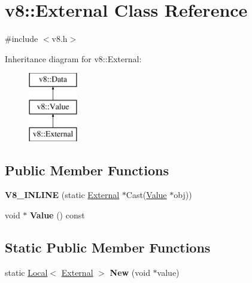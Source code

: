 \hypertarget{classv8_1_1_external}{}\section{v8\+:\+:External Class Reference}
\label{classv8_1_1_external}


{\ttfamily \#include $<$v8.\+h$>$}

Inheritance diagram for v8\+:\+:External\+:\begin{figure}[H]
\begin{center}
\leavevmode
\includegraphics[height=3.000000cm]{classv8_1_1_external}
\end{center}
\end{figure}
\subsection*{Public Member Functions}
\begin{DoxyCompactItemize}
\item 
\hypertarget{classv8_1_1_external_aa1d750d608a80332bcc7a8d92a3af201}{}{\bfseries V8\+\_\+\+I\+N\+L\+I\+N\+E} (static \hyperlink{classv8_1_1_external}{External} $\ast$Cast(\hyperlink{classv8_1_1_value}{Value} $\ast$obj))\label{classv8_1_1_external_aa1d750d608a80332bcc7a8d92a3af201}

\item 
\hypertarget{classv8_1_1_external_ac2733ee14b5b26f369e5a335c0fe3301}{}void $\ast$ {\bfseries Value} () const \label{classv8_1_1_external_ac2733ee14b5b26f369e5a335c0fe3301}

\end{DoxyCompactItemize}
\subsection*{Static Public Member Functions}
\begin{DoxyCompactItemize}
\item 
\hypertarget{classv8_1_1_external_ac870380e98927cd1e90551d7e47b8713}{}static \hyperlink{classv8_1_1_local}{Local}$<$ \hyperlink{classv8_1_1_external}{External} $>$ {\bfseries New} (void $\ast$value)\label{classv8_1_1_external_ac870380e98927cd1e90551d7e47b8713}

\end{DoxyCompactItemize}


